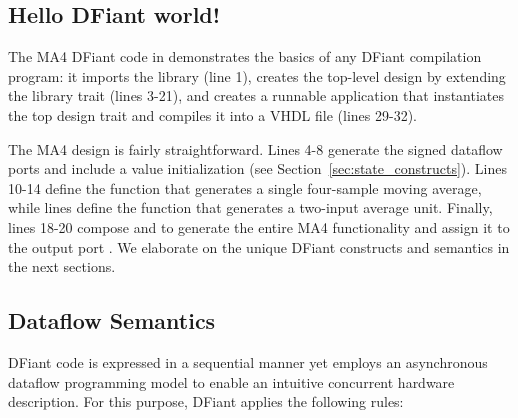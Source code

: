 \begin{table}[t!]
  \captionsetup{justification=centering}
\label{fig:MADraw}
\end{table}

\subsection{Hello DFiant world!}
The MA4 DFiant code in  demonstrates the basics of any DFiant compilation program: it imports the  library (line 1), creates the top-level design by extending the  library trait (lines 3-21), and creates a runnable application that instantiates the top design trait and compiles it into a VHDL file (lines 29-32). 

The MA4 design is fairly straightforward. Lines 4-8 generate the signed dataflow ports and include a  value initialization (see Section~\ref{sec:state_constructs}). 
Lines 10-14 define the function  that generates a single four-sample moving average, while lines  define the function  that generates a two-input average unit. Finally, lines 18-20 compose  and  to generate the entire MA4 functionality and assign it to the output port . We elaborate on the unique DFiant constructs and semantics in the next sections.


\subsection{Dataflow Semantics}
DFiant code is expressed in a sequential manner yet employs an asynchronous dataflow programming model to enable an intuitive concurrent hardware description. For this purpose, DFiant applies the following rules:

